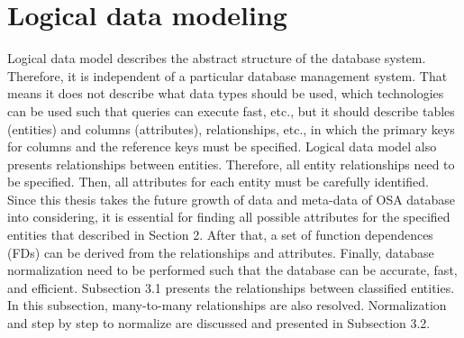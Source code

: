 \section{Logical data modeling}
Logical data model describes the abstract structure of the database system. Therefore, it is independent of a particular database management system. That means it does not describe what data types should be used, which technologies can be used such that queries can execute fast, etc., but it should describe tables (entities) and columns (attributes), relationships, etc., in which the primary keys for columns and the reference keys must be specified. Logical data model also presents relationships between entities. Therefore, all entity relationships need to be specified. Then, all attributes for each entity must be carefully identified. Since this thesis takes the future growth of data and meta-data of OSA database into considering, it is essential for finding all possible attributes for the specified entities that described in Section 2. After that, a set of function dependences (FDs) can be derived from the relationships and attributes. Finally, database normalization need to be performed such that the database can be accurate, fast, and efficient. Subsection 3.1 presents the relationships between classified entities. In this subsection, many-to-many relationships are also resolved. Normalization and step by step to normalize are discussed and presented in Subsection 3.2.
